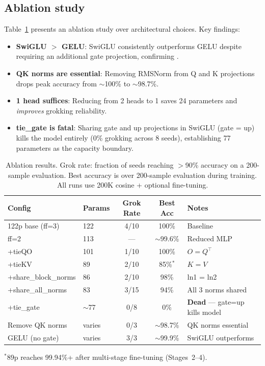 \documentclass[11pt]{article}
\begin{document}
\subsection{Ablation study}

Table~\ref{tab:ablation} presents an ablation study over architectural
choices. Key findings:

\begin{itemize}[leftmargin=*, itemsep=2pt]
  \item \textbf{SwiGLU $>$ GELU}: SwiGLU consistently outperforms GELU
    despite requiring an additional gate projection, confirming
    \citet{shazeer2020glu}.
  \item \textbf{QK norms are essential}: Removing RMSNorm from Q and K
    projections drops peak accuracy from $\sim$100\% to $\sim$98.7\%.
  \item \textbf{1 head suffices}: Reducing from 2 heads to 1 saves 24
    parameters and \emph{improves} grokking reliability.
  \item \textbf{tie\_gate is fatal}: Sharing gate and up projections in
    SwiGLU (gate = up) kills the model entirely (0\% grokking across 8
    seeds), establishing 77 parameters as the capacity boundary.
\end{itemize}

\begin{table}[t]
\centering
\caption{Ablation results. Grok rate: fraction of seeds reaching $>$90\%
accuracy on a 200-sample evaluation. Best accuracy is over 200-sample
evaluation during training. All runs use 200K cosine + optional fine-tuning.}
\label{tab:ablation}
\vspace{4pt}
\begin{tabular}{@{}llccl@{}}
\toprule
Config & Params & Grok Rate & Best Acc & Notes \\
\midrule
122p base (ff=3)       & 122 & 4/10  & 100\%   & Baseline \\
ff=2                   & 113 & ---   & $\sim$99.6\%  & Reduced MLP \\
+tieQO                 & 101 & 1/10  & 100\%   & $O = Q^\top$ \\
+tieKV                 &  89 & 2/10  & 85\%$^*$ & $K = V$ \\
+share\_block\_norms   &  86 & 2/10  & 98\%    & ln1 = ln2 \\
+share\_all\_norms     &  83 & 3/15  & 94\%    & All 3 norms shared \\
+tie\_gate             & $\sim$77 & 0/8 & 0\% & \textbf{Dead} --- gate=up kills model \\
Remove QK norms        & varies & 0/3 & $\sim$98.7\% & QK norms essential \\
GELU (no gate)         & varies & 3/3 & $\sim$99.9\% & SwiGLU outperforms \\
\bottomrule
\end{tabular}
\smallskip

{\footnotesize $^*$89p reaches 99.94\%+ after multi-stage fine-tuning (Stages~2--4).}
\end{table}
\end{document}
